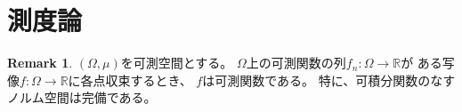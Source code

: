 \documentclass[uplatex]{jsarticle}
\theoremstyle{definition}
\newtheorem{rem}[rem]{Remark}
\newcommand{\R}{\mathbb{R}}
\begin{document}
\section{測度論}




\begin{rem}
  \((\Omega,\mu)\)を可測空間とする。
  \(\Omega\)上の可測関数の列\(f_n:\Omega\to \R\)が
  ある写像\(f:\Omega\to \R\)に各点収束するとき、
  \(f\)は可測関数である。
  特に、可積分関数のなすノルム空間は完備である。
\end{rem}
\end{document}

